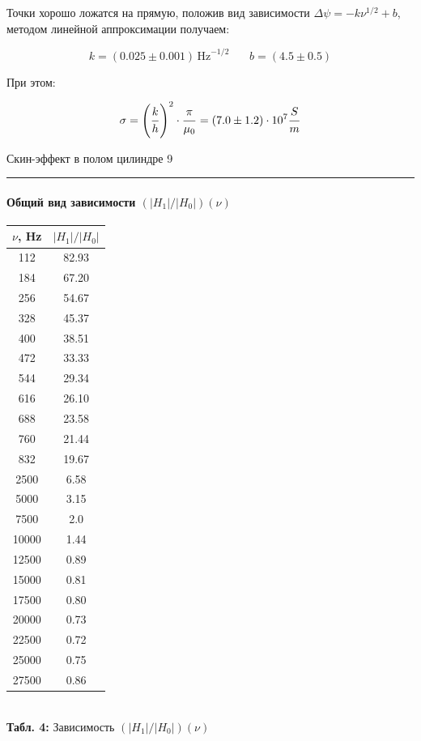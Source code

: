 \documentclass[12pt,a4paper]{scrartcl}
\begin{document}
	Точки хорошо ложатся на прямую, положив вид зависимости $\Delta \psi = -k\nu^{1/2} + b$, методом линейной аппроксимации получаем:
	
	$$k = (0.025 \pm 0.001)\,\text{Hz}^{-1/2} \ \ \ \ \ \ \ \ b = (4.5 \pm 0.5)$$
	
	При этом:
	
	$$\sigma = \left(\dfrac{\strut k}{\strut h}\right)^2 \cdot \dfrac{\strut \pi}{\strut \mu_0} = (7.0 \pm 1.2) \cdot 10^7 \dfrac{\strut S}{\strut m}$$
	
	\newpage
	
	\begin{flushleft}
		\footnotesize{Скин-эффект в полом цилиндре} \hspace{\fill} \footnotesize{9}
		\\[-0.3cm]\noindent\rule{\textwidth}{0.3pt}
	\end{flushleft}
	
	\paragraph{Общий вид зависимости $(|H_1|/|H_0|)(\nu)$} \hfill
	
	\begin{center}
		\begin{tabular}{|c|c|}
			\hline
			$\nu$, Hz & $|H_1|/|H_0|$
			\\\hline
			112 & 82.93
			\\\hline
			184 & 67.20
			\\\hline
			256 & 54.67
			\\\hline
			328 & 45.37
			\\\hline
			400 & 38.51
			\\\hline
			472 & 33.33
			\\\hline
			544 & 29.34
			\\\hline
			616 & 26.10
			\\\hline
			688 & 23.58
			\\\hline
			760 & 21.44
			\\\hline
			832 & 19.67
			\\\hline
			2500 & 6.58
			\\\hline
			5000 & 3.15
			\\\hline
			7500 & 2.0
			\\\hline
			10000 & 1.44
			\\\hline
			12500 & 0.89
			\\\hline
			15000 & 0.81
			\\\hline
			17500 & 0.80
			\\\hline
			20000 & 0.73
			\\\hline
			22500 & 0.72
			\\\hline
			25000 & 0.75
			\\\hline
			27500 & 0.86
			\\\hline
		\end{tabular}
		\\\textbf{Табл. 4:} Зависимость $(|H_1|/|H_0|)(\nu)$
	\end{center}
\end{document}
